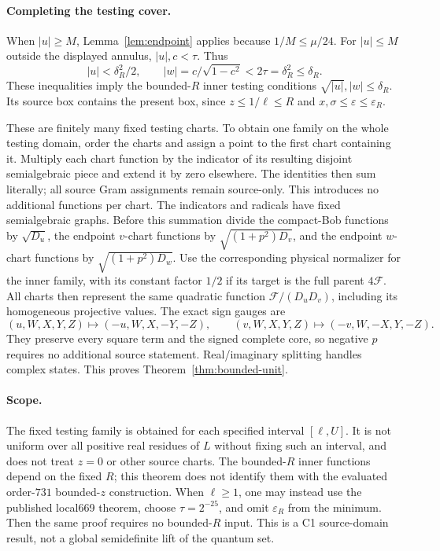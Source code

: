\documentclass[11pt]{article}
\begin{document}
\paragraph{Completing the testing cover.}
When $|u|\ge M$, Lemma~\ref{lem:endpoint} applies because
$1/M\le\mu/24$. For $|u|\le M$ outside the displayed annulus,
$|u|,c<\tau$. Thus
\[
 |u|<\delta_R^2/2,\qquad
 |w|=c/\sqrt{1-c^2}<2\tau=\delta_R^2\le\delta_R.
\]
These inequalities imply the bounded-$R$ inner testing conditions
$\sqrt{|u|},|w|\le\delta_R$. Its source box contains the present box,
since $z\le1/\ell\le R$ and $x,\sigma\le\varepsilon\le\varepsilon_R$.

These are finitely many fixed testing charts. To obtain one family
on the whole testing domain, order the charts and assign a point to
the first chart containing it. Multiply each chart function by the
indicator of its resulting disjoint semialgebraic piece and extend it
by zero elsewhere. The identities then sum literally; all source
Gram assignments remain source-only. This introduces no additional
functions per chart. The indicators and radicals have fixed
semialgebraic graphs. Before this summation divide the compact-Bob
functions by $\sqrt{D_u}$, the endpoint $v$-chart functions by
$\sqrt{(1+p^2)D_v}$, and the endpoint $w$-chart functions by
$\sqrt{(1+p^2)D_w}$. Use the corresponding physical normalizer for
the inner family, with its constant factor $1/2$ if its target is
the full parent $4\mathcal F$. All charts then represent the same
quadratic function $\mathcal F/(D_uD_v)$, including its homogeneous
projective values. The exact sign gauges are
\[
 (u,W,X,Y,Z)\longmapsto(-u,W,X,-Y,-Z),\qquad
 (v,W,X,Y,Z)\longmapsto(-v,W,-X,Y,-Z).
\]
They preserve every square term and the signed complete core, so
negative $p$ requires no additional source statement.
Real/imaginary splitting handles complex
states. This proves Theorem~\ref{thm:bounded-unit}.

\paragraph{Scope.}
The fixed testing family is obtained for each specified interval
$[\ell,U]$. It is not uniform over all positive real residues of $L$
without fixing such an interval, and does not treat $z=0$ or other
source charts. The bounded-$R$ inner functions depend on the fixed $R$;
this theorem does not identify them with the evaluated order-$731$
bounded-$z$ construction.
When $\ell\ge1$, one may instead use the published local669 theorem,
choose $\tau=2^{-25}$, and omit $\varepsilon_R$ from the minimum.
Then the same proof requires no bounded-$R$ input.
This is a C1 source-domain result, not a global semidefinite lift
of the quantum set.
\end{document}
